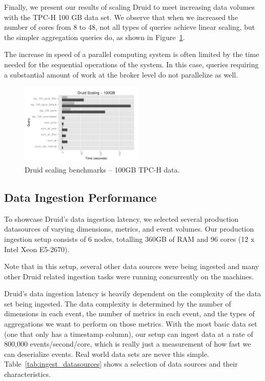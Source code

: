 \documentclass{sig-alternate-2013}
\begin{document}
Finally, we present our results of scaling Druid to meet increasing data
volumes with the TPC-H 100 GB data set. We observe that when we
increased the number of cores from 8 to 48, not all types of queries
achieve linear scaling, but the simpler aggregation queries do,
as shown in Figure~\ref{fig:tpch_scaling}.

The increase in speed of a parallel computing system is often limited by the
time needed for the sequential operations of the system. In this case, queries
requiring a substantial amount of work at the broker level do not parallelize as
well.

\begin{figure}
\centering
\includegraphics[width = 2.3in]{tpch_scaling}
\caption{Druid scaling benchmarks -- 100GB TPC-H data.}
\label{fig:tpch_scaling}
\end{figure}

\subsection{Data Ingestion Performance}
To showcase Druid's data ingestion latency, we selected several production
datasources of varying dimensions, metrics, and event volumes. Our production
ingestion setup consists of 6 nodes, totalling 360GB of RAM and 96 cores
(12 x Intel Xeon E5-2670).

Note that in this setup, several other data sources were being ingested and
many other Druid related ingestion tasks were running concurrently on the machines.

Druid's data ingestion latency is heavily dependent on the complexity of the
data set being ingested. The data complexity is determined by the number of
dimensions in each event, the number of metrics in each event, and the types of
aggregations we want to perform on those metrics. With the most basic data set
(one that only has a timestamp column), our setup can ingest data at a rate of
800,000 events/second/core, which is really just a measurement of how fast we can
deserialize events. Real world data sets are never this simple.
Table~\ref{tab:ingest_datasources} shows a selection of data sources and their
characteristics. 
\end{document}
